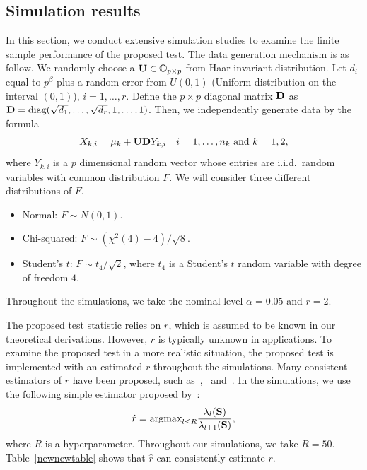 \documentclass[3p]{elsarticle}
\DeclareMathOperator{\mydiag}{diag}
\theoremstyle{plain}
\theoremstyle{definition}
\theoremstyle{remark}
\begin{document}
\subsection{Simulation results}

In this section, we conduct extensive simulation studies to examine the finite sample performance of the proposed test.
The data generation mechanism is as follow.
We randomly choose a $\mathbf{U}\in\mathbb{O}_{p\times p}$ from Haar invariant distribution.
Let $d_{i}$ equal to $p^{\beta}$ plus a random error from $U(0,1)$ (Uniform distribution on the interval $(0,1)$), $i=1,\ldots, r$.
Define the $p\times p$ diagonal matrix $\mathbf{D}$ as $\BD=\mydiag(\sqrt{d_1},\ldots,\sqrt{d_r}, 1,\ldots, 1)$.
Then, we independently generate data by the formula
$$
X_{k,i}=\mu_k+\mathbf{U} \mathbf{D} Y_{k,i}\quad \text{$i=1,\ldots,n_k$ and $k=1,2$,}
$$
where $Y_{k,i}$ is a $p$ dimensional random vector whose entries are i.i.d.\ random variables with common distribution $F$.
We will consider three different distributions of $F$.
\begin{itemize}
    \item
        Normal: $F \sim N(0,1)$.
    \item
        Chi-squared:  $F\sim (\chi^2(4)-4)/\sqrt{8}$.
    \item
        Student's $t$: $F\sim t_4/\sqrt{2}$, where $t_4$ is a Student's $t$ random variable  with degree of freedom $4$.
\end{itemize}
Throughout the simulations, we take the nominal level $\alpha=0.05$ and $r=2$.


The proposed test statistic relies on $r$, which is assumed to be known in our theoretical derivations.
However, $r$ is typically unknown in applications.
To examine the proposed test in a more realistic situation, the proposed test is implemented with an estimated $r$ throughout the simulations.
Many consistent estimators of $r$ have been proposed, such as~\cite{Bai2002},~\cite{Ahn2009Eigenvalue} and~\cite{Cai2015Optimal}.
In the simulations, we use the following simple estimator proposed by~\cite{Ahn2009Eigenvalue}:
\begin{equation*}
    \hat{r}=\textrm{argmax}_{l\leq R}\frac{\lambda_l(\mathbf{S})}{\lambda_{l+1}(\mathbf{S})},
\end{equation*}
where $R$ is a hyperparameter. Throughout our simulations, we take $R=50$.
Table~\ref{newnewtable} shows that $\hat{r}$ can consistently estimate $r$.
\end{document}
